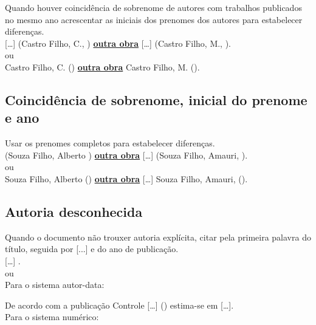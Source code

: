 Quando houver coincidência de sobrenome de autores com trabalhos
publicados no mesmo ano acrescentar as iniciais dos prenomes dos autores
para estabelecer diferenças.\\

[\ldots] (Castro Filho, C., \citeyear{CastroC2012}) \textbf{\underline{outra obra}}   [\ldots] (Castro Filho, M., \citeyear{CastroC2012}). \\

ou\\

Castro Filho, C. (\citeyear{CastroC2012}) \textbf{\underline{outra obra}}    Castro Filho, M. (\citeyear{CastroC2012}).

\subsection{Coincidência de sobrenome, inicial do prenome e ano}

Usar os prenomes completos para estabelecer diferenças. \\

(Souza Filho, Alberto \citeyear{Souza2015}) \textbf{\underline{outra obra}}   [\ldots] (Souza Filho, Amauri, \citeyear{Souza2015}). \\


ou\\


Souza Filho, Alberto (\citeyear{Souza2015}) \textbf{\underline{outra obra}}   [\ldots] Souza Filho, Amauri, (\citeyear{Souza2015}). \\


\subsection{Autoria desconhecida}

Quando o documento não trouxer autoria explícita, citar pela primeira palavra do título, seguida por [...] e do ano de publicação.\\

[\ldots] \cite{Controle2015}.\\

ou \\

Para o sistema autor-data: 

De acordo com a publicação Controle [\ldots] (\citeyear{Controle2015}) estima-se em [\ldots].\\

Para o sistema numérico:

